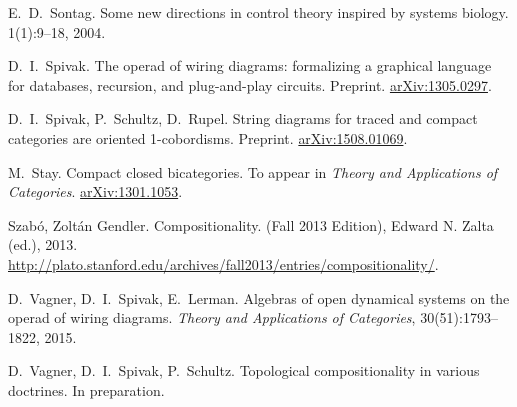 \begin{thebibliography}{RSW00}
    E.\ D.\ Sontag. 
    \newblock Some new directions in control theory inspired
    by systems biology.
     { 1}(1):9--18, 2004. 


    D.\ I.\  Spivak.
    \newblock The operad of wiring diagrams:
    formalizing a graphical language for databases, recursion, and plug-and-play
    circuits.
    \newblock Preprint.
    \newblock 
    \href{http://arxiv.org/abs/1305.0297}{arXiv:1305.0297}.

    D.\ I.\ Spivak, P.\ Schultz, D.\ Rupel.
    \newblock String diagrams for traced and compact categories are oriented
    1-cobordisms.
    \newblock Preprint.
    \newblock \href{http://arxiv.org/abs/1508.01069}{arXiv:1508.01069}.

    M.\ Stay.
    \newblock Compact closed bicategories.
    \newblock To appear in {\em Theory and Applications of Categories}.
    \newblock \href{http://arxiv.org/abs/1301.1053}{arXiv:1301.1053}.

    Szab\'o, Zolt\'an Gendler.
    \newblock Compositionality. 
    (Fall 2013 Edition), Edward N. Zalta (ed.), 2013.
    \newblock
    \href{http://plato.stanford.edu/archives/fall2013/entries/compositionality/}{http://plato.stanford.edu/archives/fall2013/entries/compositionality/}.


    D.\ Vagner, D.\ I.\ Spivak, E.\ Lerman.
    \newblock Algebras of open dynamical systems on the operad of wiring
    diagrams.
    \newblock \emph{Theory and Applications of Categories}, 30(51):1793--1822,
    2015. 

    D.\ Vagner, D.\ I.\ Spivak, P.\ Schultz.
    \newblock Topological compositionality in various doctrines.
    \newblock In preparation.





\end{thebibliography}
